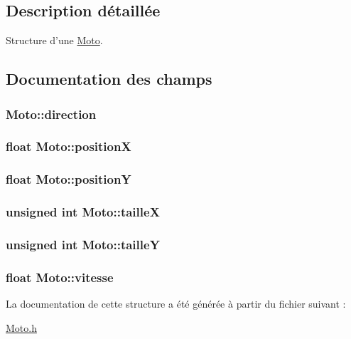 \subsection{Description détaillée}
Structure d'une \hyperlink{structMoto}{Moto}. 

\subsection{Documentation des champs}
\hypertarget{structMoto_ace42f991dc2d223029ca7f7162a10e9b}{
\subsubsection[{direction}]{ Moto\-::direction}}\label{structMoto_ace42f991dc2d223029ca7f7162a10e9b}
\hypertarget{structMoto_a7d9695eb69a7161d1a6800e4b8bc4170}{
\subsubsection[{position\-X}]{\setlength{\rightskip}{0pt plus 5cm}float Moto\-::position\-X}}\label{structMoto_a7d9695eb69a7161d1a6800e4b8bc4170}
\hypertarget{structMoto_a68859bbff76786aedccab8093a9de5a8}{
\subsubsection[{position\-Y}]{\setlength{\rightskip}{0pt plus 5cm}float Moto\-::position\-Y}}\label{structMoto_a68859bbff76786aedccab8093a9de5a8}
\hypertarget{structMoto_a15d1b56209aba6ea0bc8eeaac82ae625}{
\subsubsection[{taille\-X}]{\setlength{\rightskip}{0pt plus 5cm}unsigned int Moto\-::taille\-X}}\label{structMoto_a15d1b56209aba6ea0bc8eeaac82ae625}
\hypertarget{structMoto_ab7b358839b7d20f16a4a17e5eabad5a4}{
\subsubsection[{taille\-Y}]{\setlength{\rightskip}{0pt plus 5cm}unsigned int Moto\-::taille\-Y}}\label{structMoto_ab7b358839b7d20f16a4a17e5eabad5a4}
\hypertarget{structMoto_a561dfc3e54a534dfa92ccecbea8dbe71}{
\subsubsection[{vitesse}]{\setlength{\rightskip}{0pt plus 5cm}float Moto\-::vitesse}}\label{structMoto_a561dfc3e54a534dfa92ccecbea8dbe71}


La documentation de cette structure a été générée à partir du fichier suivant \-:\begin{DoxyCompactItemize}
\item 
\hyperlink{Moto_8h}{Moto.\-h}\end{DoxyCompactItemize}
